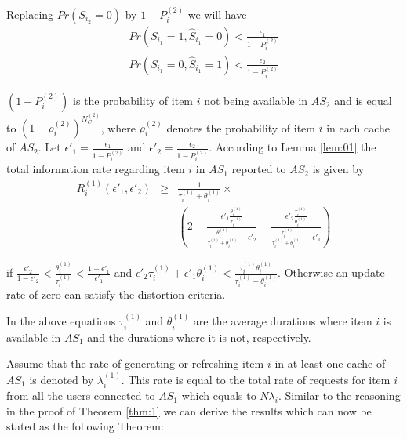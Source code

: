 \documentclass[conference]{IEEEtran}
\theoremstyle{plain}
\theoremstyle{remark}
\begin{document}
Replacing $Pr(S_{i_2}=0)$ by $1-P^{(2)}_i$ we will have
\begin{eqnarray}
Pr(S_{i_1}=1, \hat{S}_{i_1}=0)<\frac{\epsilon_1}{1-P^{(2)}_i} \nonumber \\
Pr(S_{i_1}=0, \hat{S}_{i_1}=1)<\frac{\epsilon_2}{1-P^{(2)}_i}
\end{eqnarray}

$(1-P^{(2)}_i)$ is the probability of item $i$ not being available in $AS_2$ and is equal to $(1-\rho^{(2)}_i)^{N^{(2)}_C}$, where $\rho^{(2)}_i$ denotes the probability of item $i$ in each cache of $AS_2$. Let $\epsilon'_1=\frac{\epsilon_1}{1-P^{(2)}_i}$ and $\epsilon'_2=\frac{\epsilon_2}{1-P^{(2)}_i}$.
According to Lemma \ref{lem:01} the total information rate regarding item $i$ in $AS_1$ reported to $AS_2$ is given by
\begin{eqnarray}
	R^{(1)}_i(\epsilon'_1,\epsilon'_2)&\geq& \frac{1}{\tau^{(1)}_i+\theta^{(1)}_i} \times  \label{eq:r1i}  \\
&&(2-\frac{\epsilon'_1\frac{\theta^{(1)}_i}{\tau^{(1)}_i}}{\frac{\theta^{(1)}_i}{\tau^{(1)}_i+\theta^{(1)}_i}-\epsilon'_2}-\frac{\epsilon'_2\frac{\tau^{(1)}_i}{\theta^{(1)}_i}}{\frac{\tau^{(1)}_i}{\tau^{(1)}_i+\theta^{(1)}_i}-\epsilon'_1}) \nonumber
\end{eqnarray}

if $\frac{\epsilon'_2}{1-\epsilon'_2} < \frac{\theta^{(1)}_i}{\tau^{(1)}_i} < \frac{1-\epsilon'_1}{\epsilon'_1}$ and $\epsilon'_2 \tau^{(1)}_i+\epsilon'_1 \theta^{(1)}_i < \frac{\tau^{(1)}_i \theta^{(1)}_i}{\tau^{(1)}_i+\theta^{(1)}_i}$. Otherwise an update rate of zero can satisfy the distortion criteria.
	
In the above equations $\tau^{(1)}_i$ and $\theta^{(1)}_i$ are the average durations where item $i$ is available in $AS_1$ and the durations where it is not, respectively.

Assume that the rate of generating or refreshing item $i$ in at least one cache of $AS_1$ is denoted by $\lambda^{(1)}_i$. This rate is equal to the total rate of requests for item $i$ from all the users connected to $AS_1$ which equals to $N\lambda_i$. Similar to the reasoning in the proof of Theorem \ref{thm:1} we can derive the results which can now be stated as the following Theorem:
\end{document}
